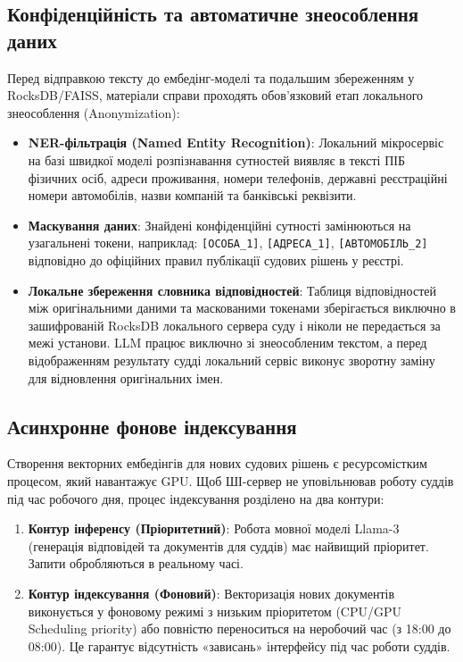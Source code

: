 \documentclass{article}
\begin{document}
\subsection{Конфіденційність та автоматичне знеособлення даних}
Перед відправкою тексту до ембедінг-моделі та подальшим збереженням у RocksDB/FAISS, матеріали справи проходять обов'язковий етап локального знеособлення (Anonymization):
\begin{itemize}
\item \textbf{NER-фільтрація (Named Entity Recognition)}: Локальний мікросервіс на базі швидкої моделі розпізнавання сутностей виявляє в тексті ПІБ фізичних осіб, адреси проживання, номери телефонів, державні реєстраційні номери автомобілів, назви компаній та банківські реквізити.
\item \textbf{Маскування даних}: Знайдені конфіденційні сутності замінюються на узагальнені токени, наприклад: \texttt{[ОСОБА\_1]}, \texttt{[АДРЕСА\_1]}, \texttt{[АВТОМОБІЛЬ\_2]} відповідно до офіційних правил публікації судових рішень у реєстрі.
\item \textbf{Локальне збереження словника відповідностей}: Таблиця відповідностей між оригінальними даними та маскованими токенами зберігається виключно в зашифрованій RocksDB локального сервера суду і ніколи не передається за межі установи. LLM працює виключно зі знеособленим текстом, а перед відображенням результату судді локальний сервіс виконує зворотну заміну для відновлення оригінальних імен.
\end{itemize}

\subsection{Асинхронне фонове індексування}
Створення векторних ембедінгів для нових судових рішень є ресурсомістким процесом, який навантажує GPU. Щоб ШІ-сервер не уповільнював роботу суддів під час робочого дня, процес індексування розділено на два контури:
\begin{enumerate}
\item \textbf{Контур інференсу (Пріоритетний)}: Робота мовної моделі Llama-3 (генерація відповідей та документів для суддів) має найвищий пріоритет. Запити обробляються в реальному часі.
\item \textbf{Контур індексування (Фоновий)}: Векторизація нових документів виконується у фоновому режимі з низьким пріоритетом (CPU/GPU Scheduling priority) або повністю переноситься на неробочий час (з 18:00 до 08:00). Це гарантує відсутність «зависань» інтерфейсу під час роботи суддів.
\end{enumerate}
\end{document}
